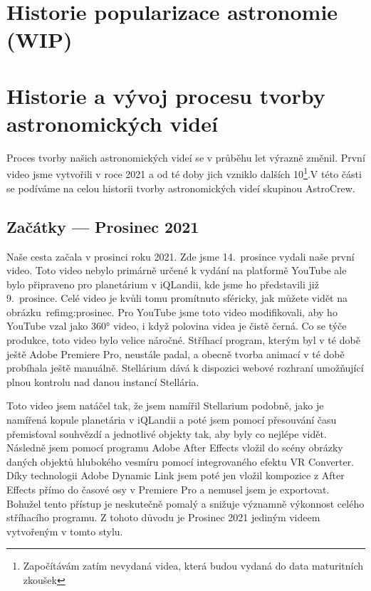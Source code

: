 \documentclass[12pt,a4paper,titlepage]{article}
\begin{document}
\section{Historie popularizace astronomie (WIP)}

\section{Historie a vývoj procesu tvorby astronomických videí}
Proces tvorby našich astronomických videí se v průběhu let výrazně změnil. První video jsme vytvořili v roce 2021 a od té doby jich vzniklo dalších 10\footnote{Započítávám zatím nevydaná videa, která budou vydaná do data maturitních zkoušek}.V této části se podíváme na celou historii tvorby astronomických videí skupinou AstroCrew.
\subsection{Začátky --- Prosinec 2021}
Naše cesta začala v prosinci roku 2021. Zde jsme 14.\ prosince vydali naše první video. Toto video nebylo primárně určené k vydání na platformě YouTube ale bylo připraveno pro planetárium v iQLandii, kde jsme ho představili již 9.\ prosince. Celé video je kvůli tomu promítnuto sféricky, jak můžete vidět na obrázku~ref{img:prosinec}. Pro YouTube jsme toto video modifikovali, aby ho YouTube vzal jako 360° video, i když polovina videa je čistě černá. Co se týče produkce, toto video bylo velice náročné. Stříhací program, kterým byl v té době ještě Adobe Premiere Pro, neustále padal, a obecně tvorba animací v té době probíhala ještě manuálně. Stellárium dává k dispozici webové rozhraní umožňující plnou kontrolu nad danou instancí Stellária. 

Toto video jsem natáčel tak, že jsem namířil Stellarium podobně, jako je namířená kopule planetária v iQLandii a poté jsem pomocí přesouvání času přemisťoval souhvězdí a jednotlivé objekty tak, aby byly co nejlépe vidět. Následně jsem pomocí programu Adobe After Effects vložil do scény obrázky daných objektů hlubokého vesmíru pomocí integrovaného efektu VR Converter. Díky technologii Adobe Dynamic Link jsem poté jen vložil kompozice z After Effects přímo do časové osy v Premiere Pro a nemusel jsem je exportovat. Bohužel tento přístup je neskutečně pomalý a snižuje významně výkonnost celého stříhacího programu. Z tohoto důvodu je Prosinec 2021 jediným videem vytvořeným v tomto stylu.
\end{document}
